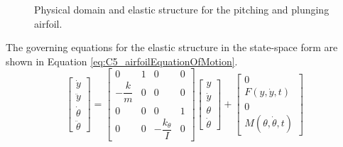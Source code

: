 %
\begin{figure}[H]
    \centering
    \quad
    \caption{Physical domain and elastic structure for the pitching and plunging airfoil.}
\end{figure}
%
The governing equations for the elastic structure in the state-space form are shown in Equation \eqref{eq:C5_airfoilEquationOfMotion}.
%
\begin{equation}\label{eq:C5_airfoilEquationOfMotion}
\begin{bmatrix}
	\dot{y} \\
	\ddot{y} \\
	\dot{\theta} \\
	\ddot{\theta}
\end{bmatrix} = 
\begin{bmatrix}
	0 & 1 & 0 & 0 \\
	-\dfrac{k}{m} & 0 & 0 & 0 \\
	0 & 0 & 0 & 1 \\
	0 & 0 & -\dfrac{k_\theta}{I} & 0
\end{bmatrix}
\begin{bmatrix}
	y \\
	\dot{y} \\
	\theta \\
	\dot{\theta}
\end{bmatrix} + 
\begin{bmatrix}
	0 \\
	F \left( y, \dot{y}, t \right) \\
	0 \\
	M \left( \theta, \dot{\theta}, t \right)
\end{bmatrix}
\end{equation}
